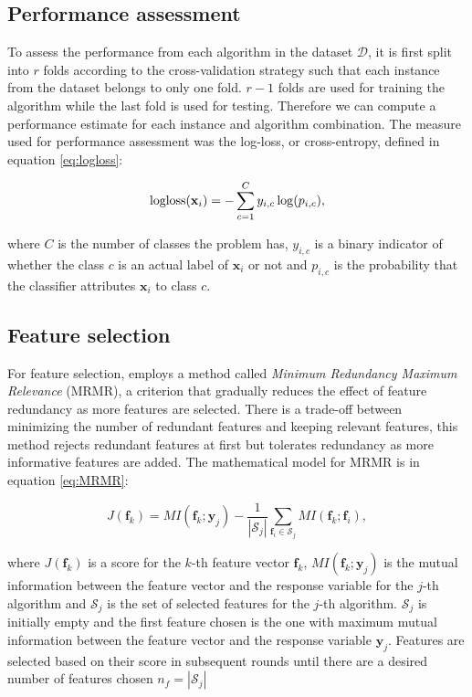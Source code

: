 \newpage
\subsection{Performance assessment}

To assess the performance from each algorithm in the dataset $\mathcal{D}$, it is first split into $r$ folds according to the cross-validation strategy such that each instance from the dataset belongs to only one fold. $r-1$ folds are used for training the algorithm while the last fold is used for testing. Therefore we can compute a performance estimate for each instance and algorithm combination. The measure used for performance assessment was the log-loss, or cross-entropy, defined in equation \ref{eq:logloss}:

\begin{equation} \label{eq:logloss}
	\logloss(\mathbf{x}_i) = - \sum_{c=1}^{C} y_{i, c} \log(p_{i, c}),
\end{equation}

where $C$ is the number of classes the problem has, $y_{i, c}$ is a binary indicator of whether the class $c$ is an actual label of $\mathbf{x}_i$ or not and $p_{i, c}$ is the probability that the classifier attributes $\mathbf{x}_i$ to class $c$.

\subsection{Feature selection}

For feature selection,  employs a method called \emph{Minimum Redundancy Maximum Relevance} (MRMR), a criterion that gradually reduces the effect of feature redundancy as more features are selected. There is a trade-off between minimizing the number of redundant features and keeping relevant features, this method rejects redundant features at first but tolerates redundancy as more informative features are added. The mathematical model for MRMR is in equation \ref{eq:MRMR}:

\begin{equation} \label{eq:MRMR}
	J(\mathbf{f}_k) = MI(\mathbf{f}_k; \mathbf{y}_j) - \frac{1}{|\mathcal{S}_j|} \sum_{\mathbf{f}_i \in \mathcal{S}_j} MI(\mathbf{f}_k; \mathbf{f}_i),
\end{equation}

where $J(\mathbf{f}_k)$ is a score for the $k$-th feature vector $\mathbf{f}_k$, $ MI(\mathbf{f}_k; \mathbf{y}_j)$ is the mutual information between the feature vector and the response variable for the $j$-th algorithm and $\mathcal{S}_j$ is the set of selected features for the $j$-th algorithm. $\mathcal{S}_j$ is initially empty and the first feature chosen is the one with maximum mutual information between the feature vector and the response variable $\mathbf{y}_j$. Features are selected based on their score in subsequent rounds until there are a desired number of features chosen $n_f = |\mathcal{S}_j|$

